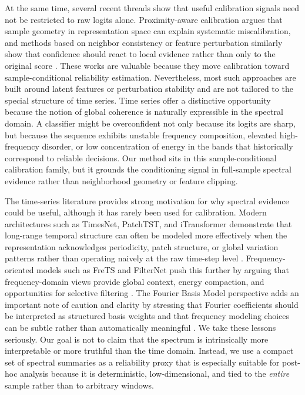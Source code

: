 \documentclass{article}
\begin{document}
At the same time, several recent threads show that useful calibration signals need not be restricted to raw logits alone. Proximity-aware calibration argues that sample geometry in representation space can explain systematic miscalibration, and methods based on neighbor consistency or feature perturbation similarly show that confidence should react to local evidence rather than only to the original score \cite{xiong2023procal,tao2024consistency,tao2024feature}. These works are valuable because they move calibration toward sample-conditional reliability estimation. Nevertheless, most such approaches are built around latent features or perturbation stability and are not tailored to the special structure of time series. Time series offer a distinctive opportunity because the notion of global coherence is naturally expressible in the spectral domain. A classifier might be overconfident not only because its logits are sharp, but because the sequence exhibits unstable frequency composition, elevated high-frequency disorder, or low concentration of energy in the bands that historically correspond to reliable decisions. Our method sits in this sample-conditional calibration family, but it grounds the conditioning signal in full-sample spectral evidence rather than neighborhood geometry or feature clipping.

The time-series literature provides strong motivation for why spectral evidence could be useful, although it has rarely been used for calibration. Modern architectures such as TimesNet, PatchTST, and iTransformer demonstrate that long-range temporal structure can often be modeled more effectively when the representation acknowledges periodicity, patch structure, or global variation patterns rather than operating naively at the raw time-step level \cite{wu2023timesnet,nie2023patchtst,liu2024itransformer}. Frequency-oriented models such as FreTS and FilterNet push this further by arguing that frequency-domain views provide global context, energy compaction, and opportunities for selective filtering \cite{yi2023frets,yi2024filternet}. The Fourier Basis Model perspective adds an important note of caution and clarity by stressing that Fourier coefficients should be interpreted as structured basis weights and that frequency modeling choices can be subtle rather than automatically meaningful \cite{yang2024fbm}. We take these lessons seriously. Our goal is not to claim that the spectrum is intrinsically more interpretable or more truthful than the time domain. Instead, we use a compact set of spectral summaries as a reliability proxy that is especially suitable for post-hoc analysis because it is deterministic, low-dimensional, and tied to the \emph{entire} sample rather than to arbitrary windows.
\end{document}
